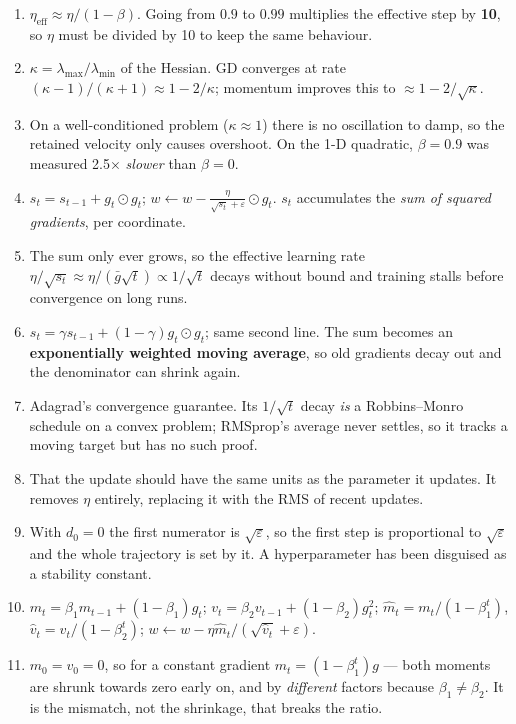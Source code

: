 \documentclass[11pt,a4paper]{article}
\newcommand{\A}[1]{\item[\textbf{#1}]}
\begin{document}
\begin{enumerate}[leftmargin=1.9cm]
\A{U3.9} $\eta_{\text{eff}} \approx \eta/(1-\beta)$. Going from $0.9$ to
$0.99$ multiplies the effective step by \textbf{10}, so $\eta$ must be divided
by 10 to keep the same behaviour.

\A{U3.10} $\kappa = \lambda_{\max}/\lambda_{\min}$ of the Hessian. GD converges
at rate $(\kappa-1)/(\kappa+1) \approx 1 - 2/\kappa$; momentum improves this to
$\approx 1 - 2/\sqrt\kappa$.

\A{U3.11} On a well-conditioned problem ($\kappa \approx 1$) there is no
oscillation to damp, so the retained velocity only causes overshoot. On the
1-D quadratic, $\beta = 0.9$ was measured 2.5$\times$ \emph{slower} than
$\beta = 0$.

\A{U3.12} $s_t = s_{t-1} + g_t \odot g_t$;
$w \leftarrow w - \frac{\eta}{\sqrt{s_t}+\varepsilon} \odot g_t$.
$s_t$ accumulates the \emph{sum of squared gradients}, per coordinate.

\A{U3.13} The sum only ever grows, so the effective learning rate
$\eta/\sqrt{s_t} \approx \eta/(\bar g\sqrt t) \propto 1/\sqrt t$ decays without
bound and training stalls before convergence on long runs.

\A{U3.14} $s_t = \gamma s_{t-1} + (1-\gamma)g_t\odot g_t$; same second line.
The sum becomes an \textbf{exponentially weighted moving average}, so old
gradients decay out and the denominator can shrink again.

\A{U3.15} Adagrad's convergence guarantee. Its $1/\sqrt t$ decay \emph{is} a
Robbins--Monro schedule on a convex problem; RMSprop's average never settles,
so it tracks a moving target but has no such proof.

\A{U3.16} That the update should have the same units as the parameter it
updates. It removes $\eta$ entirely, replacing it with the RMS of recent
updates.

\A{U3.17} With $d_0 = 0$ the first numerator is $\sqrt\varepsilon$, so the
first step is proportional to $\sqrt\varepsilon$ and the whole trajectory is
set by it. A hyperparameter has been disguised as a stability constant.

\A{U3.18} $m_t = \beta_1 m_{t-1} + (1-\beta_1)g_t$;
$v_t = \beta_2 v_{t-1} + (1-\beta_2)g_t^2$;
$\hat m_t = m_t/(1-\beta_1^t)$, $\hat v_t = v_t/(1-\beta_2^t)$;
$w \leftarrow w - \eta\hat m_t/(\sqrt{\hat v_t}+\varepsilon)$.

\A{U3.19} $m_0 = v_0 = 0$, so for a constant gradient
$m_t = (1-\beta_1^t)g$ --- both moments are shrunk towards zero early on, and
by \emph{different} factors because $\beta_1 \ne \beta_2$. It is the mismatch,
not the shrinkage, that breaks the ratio.


\end{enumerate}
\end{document}
